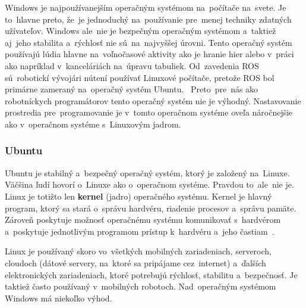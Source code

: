 Windows je najpoužívanejším operačným systémom na~počítače na~svete. Je to~hlavne preto, že~je jednoduchý na~používanie
pre~menej techniky zdatných užívateľov. Windows ale~nie je bezpečným operačným systémom a~taktiež aj~jeho stabilita a~rýchlosť
nie sú~na~najvyššej úrovni. Tento operačný systém používajú lúdia hlavne na~voľnočasové aktivity ako je hranie hier
alebo v~práci ako napríklad v~kanceláriách na~úpravu tabuliek. Od~zavedenia ROS sú~robotickí vývojári nútení používať
Linuxové počítače, pretože ROS bol primárne zameraný na~operačný systém Ubuntu.~\cite{ros_windows_ubuntu} Preto~pre~nás ako
robotníckych programátorov tento operačný systém nie je výhodný. Nastavovanie prostredia pre~programovanie je v~tomto
operačnom systéme oveľa náročnejšie ako v~operačnom systéme s~Linuxovým jadrom.

\subsubsection{Ubuntu}
\label{sec:ubuntu}

Ubuntu je stabilný a~bezpečný operačný systém, ktorý je založený na~Linuxe. Väčšina ľudí hovorí o~Linuxe ako o~operačnom systéme. Pravdou
to~ale~nie je. Linux je totižto len \textbf{kernel} (jadro) operačného systému. Kernel je hlavný program, ktorý sa stará o~správu hardvéru,
riadenie procesov a~správu pamäte. Zároveň poskytuje možnosť operačnému systému komunikovať s~hardvérom a~poskytuje jednotlivým programom
prístup k~hardvéru a~jeho častiam~\cite{chatgpt}.

Linux je používaný skoro vo~všetkých mobilných zariadeniach, serveroch, cloudoch (dátové servery, na~ktoré sa pripájame cez~internet)
a~ďalších elektronických zariadeniach, ktoré potrebujú rýchlosť, stabilitu a~bezpečnosť. Je taktiež často používaný v~mobilných
robotoch. Nad~operačným systémom Windows má niekoľko výhod.

